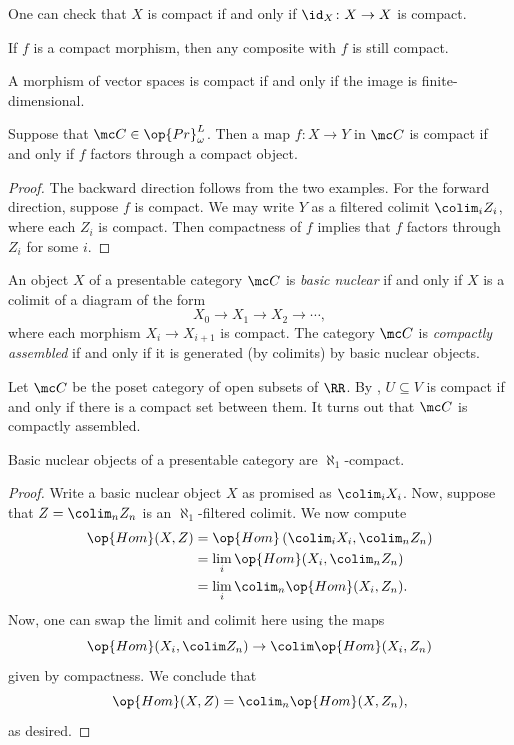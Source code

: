 \documentclass[../notes.tex]{subfiles}
\begin{document}
\begin{example}
	One can check that $X$ is compact if and only if $\id_X\colon X\to X$ is compact.
\end{example}
\begin{example}
	If $f$ is a compact morphism, then any composite with $f$ is still compact.
\end{example}
\begin{example}
	A morphism of vector spaces is compact if and only if the image is finite-dimensional.
\end{example}
\begin{lemma} \label{lem:better-compact-morphism}
	Suppose that $\mc C\in\op{Pr}^L_\omega$. Then a map $f\colon X\to Y$ in $\mc C$ is compact if and only if $f$ factors through a compact object.
\end{lemma}
\begin{proof}
	The backward direction follows from the two examples. For the forward direction, suppose $f$ is compact. We may write $Y$ as a filtered colimit $\colim_iZ_i$, where each $Z_i$ is compact. Then compactness of $f$ implies that $f$ factors through $Z_i$ for some $i$.
\end{proof}
\begin{definition}
	An object $X$ of a presentable category $\mc C$ is \textit{basic nuclear} if and only if $X$ is a colimit of a diagram of the form
	\[X_0\to X_1\to X_2\to\cdots,\]
	where each morphism $X_i\to X_{i+1}$ is compact. The category $\mc C$ is \textit{compactly assembled} if and only if it is generated (by colimits) by basic nuclear objects.
\end{definition}
\begin{example}
	Let $\mc C$ be the poset category of open subsets of $\RR$. By , $U\subseteq V$ is compact if and only if there is a compact set between them. It turns out that $\mc C$ is compactly assembled.
\end{example}
\begin{proposition}
	Basic nuclear objects of a presentable category are $\aleph_1$-compact.
\end{proposition}
\begin{proof}
	Write a basic nuclear object $X$ as promised as $\colim_iX_i$. Now, suppose that $Z=\colim_nZ_n$ is an $\aleph_1$-filtered colimit. We now compute
	\begin{align*}
		\op{Hom}(X,Z) &= \op{Hom}\left(\colim_iX_i,\colim_nZ_n\right) \\
		&= \lim_i\op{Hom}(X_i,\colim_n Z_n) \\
		&= \lim_i\colim_n\op{Hom}(X_i,Z_n).
	\end{align*}
	Now, one can swap the limit and colimit here using the maps
	\[\op{Hom}(X_i,\colim Z_n)\to\colim\op{Hom}(X_i,Z_n)\]
	given by compactness. We conclude that
	\[\op{Hom}(X,Z)=\colim_n\op{Hom}(X,Z_n),\]
	as desired.
\end{proof}
\end{document}
